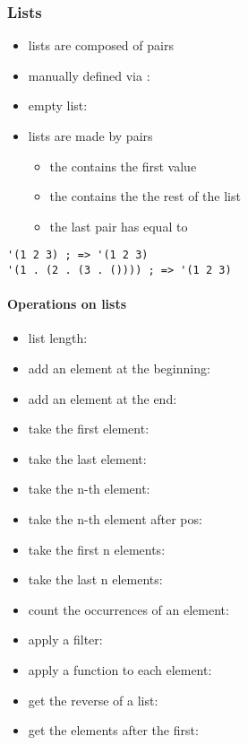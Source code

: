 \documentclass[a4paper,landscape,10pt]{article}
\begin{document}
\begin{multicols*}{2}
  \subsubsection{Lists}

  \begin{itemize}
    \item lists are composed of pairs
    \item manually defined via : 
    \item empty list: 
    \item lists are made by pairs
          \begin{itemize} \item the  contains the first value
            \item the  contains the the rest of the list
            \item the last pair has  equal to 
          \end{itemize}
  \end{itemize}

  \begin{lstlisting}[language=Racket]
'(1 2 3) ; => '(1 2 3)
'(1 . (2 . (3 . ()))) ; => '(1 2 3)
\end{lstlisting}

  \paragraph{Operations on lists}

  \begin{itemize}
    \item list length: 
    \item add an element at the beginning: 
    \item add an element at the end: 
    \item take the first element: 
    \item take the last element: 
    \item take the n-th element: 
    \item take the n-th element after pos: 
    \item take the first n elements: 
    \item take the last n elements: 
    \item count the occurrences of an element: 
    \item apply a filter: 
    \item apply a function to each element: 
    \item get the reverse of a list: 
    \item get the elements after the first: 
  \end{itemize}


\end{multicols*}
\end{document}
